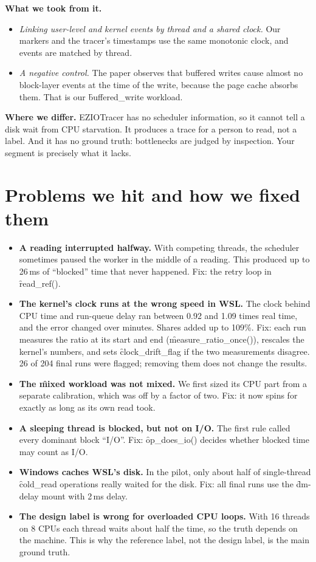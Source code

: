 \documentclass[11pt]{article}
\begin{document}
\textbf{What we took from it.}
\begin{itemize}
\item \emph{Linking user-level and kernel events by thread and a shared clock.} Our markers and the tracer's timestamps use the same monotonic clock, and events are matched by thread.
\item \emph{A negative control.} The paper observes that buffered writes cause almost no block-layer events at the time of the write, because the page cache absorbs them. That is our \f{buffered\_write} workload.
\end{itemize}

\textbf{Where we differ.} EZIOTracer has no scheduler information, so it cannot tell a disk wait from CPU starvation. It produces a trace for a person to read, not a label. And it has no ground truth: bottlenecks are judged by inspection. Your segment is precisely what it lacks.

\section{Problems we hit and how we fixed them}

\begin{itemize}
\item \textbf{A reading interrupted halfway.} With competing threads, the scheduler sometimes paused the worker in the middle of a reading. This produced up to 26\,ms of ``blocked'' time that never happened. Fix: the retry loop in \f{read\_ref()}.
\item \textbf{The kernel's clock runs at the wrong speed in WSL.} The clock behind CPU time and run-queue delay ran between 0.92 and 1.09 times real time, and the error changed over minutes. Shares added up to 109\%. Fix: each run measures the ratio at its start and end (\f{measure\_ratio\_once()}), rescales the kernel's numbers, and sets \f{clock\_drift\_flag} if the two measurements disagree. 26 of 204 final runs were flagged; removing them does not change the results.
\item \textbf{The \f{mixed} workload was not mixed.} We first sized its CPU part from a separate calibration, which was off by a factor of two. Fix: it now spins for exactly as long as its own read took.
\item \textbf{A sleeping thread is blocked, but not on I/O.} The first rule called every dominant block ``I/O''. Fix: \f{op\_does\_io()} decides whether blocked time may count as I/O.
\item \textbf{Windows caches WSL's disk.} In the pilot, only about half of single-thread \f{cold\_read} operations really waited for the disk. Fix: all final runs use the \f{dm-delay} mount with 2\,ms delay.
\item \textbf{The design label is wrong for overloaded CPU loops.} With 16 threads on 8 CPUs each thread waits about half the time, so the truth depends on the machine. This is why the reference label, not the design label, is the main ground truth.
\end{itemize}
\end{document}
